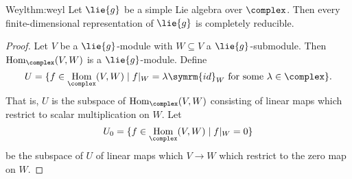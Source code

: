 \documentclass[fleqn]{NotesClass}
\DeclareMathOperator{\Hom}{Hom}
\newcommand{\id}{\symrm{id}}
\begin{document}
    \begin{thm}{Weyl}{thm:weyl}
        Let \(\lie{g}\) be a simple Lie algebra over \(\complex\).
        Then every finite-dimensional representation of \(\lie{g}\) is completely reducible.
        \begin{proof}
            Let \(V\) be a \(\lie{g}\)-module with \(W \subseteq V\) a \(\lie{g}\)-submodule.
            Then \(\Hom_{\complex}(V, W)\) is a \(\lie{g}\)-module.
            Define
            \begin{equation}
                U = \{f \in \Hom_{\complex}(V, W) \mid f|_W = \lambda \id_W \text{ for some } \lambda \in \complex\}.
            \end{equation}
            That is, \(U\) is the subspace of \(\Hom_{\complex}(V, W)\) consisting of linear maps which restrict to scalar multiplication on \(W\).
            Let
            \begin{equation}
                U_0 = \{f \in \Hom_{\complex}(V, W) \mid f|_W = 0\}
            \end{equation}
            be the subspace of \(U\) of linear maps which \(V \to W\) which restrict to the zero map on \(W\).
            

\end{proof}
\end{thm}
\end{document}
